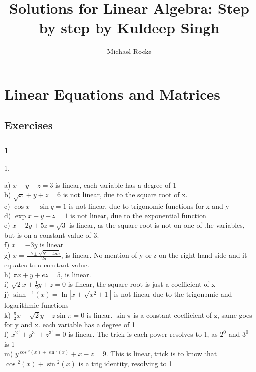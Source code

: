 \documentclass[]{report}
\title{Solutions for Linear Algebra: Step by step by Kuldeep Singh}
\author{Michael Rocke}
\begin{document}
\maketitle

\tableofcontents

\chapter{Linear Equations and Matrices}
\section {Exercises}


\subsection{1}

1.

a) $x - y -z = 3$ is linear, each variable has a degree of 1
\\
b) $\sqrt{x} + y + z = 6$ is not linear, due to the square root of x. 
\\
c) $\cos{x} + \sin{y} = 1$ is not linear, due to trigonomic functions for x and y
\\
d) $\exp{x + y + z} = 1$  is not linear, due to the exponential function
\\
e) $x - 2y + 5z = \sqrt{3}$ is linear, as the square root is not on one of the variables, but is on a constant value of 3. 
\\
f) $x = -3y$ is linear
\\
g) $x = \frac{-b \pm \sqrt{b^2 - 4ac}}{2a}$, is linear. No mention of y or z on the right hand side and it equates to a constant value.
\\
h) $\pi{}x + y + ez = 5$, is linear. 
\\
i) $\sqrt{2}x + \frac{1}{2}y + z = 0$ is linear, the square root is just a coefficient of x
\\
j) $\sinh{^{-1}}({x}) = \ln|x + \sqrt{x^2 + 1}| $ is not linear due to the trigonomic and logarithmic functions
\\
k) $\frac{\pi}{2}x - \sqrt{2}y + z\sin{\pi} = 0$ is linear. $\sin{\pi}$ is a constant coefficient of z, same goes for y and x. each variable has a degree of 1
\\
l) $x^{2^0} + y^{3^0} + z^{3^0} = 0$ is linear. The trick is each power resolves to 1, as $2^0$ and $3^0$ is 1
\\
m) $y^{\cos{^2}(x) + \sin{^2}(x)} + x - z = 9$. This is linear, trick is to know that ${\cos{^2}(x) + \sin{^2}(x)} $ is a trig identity, resolving to 1
\\
\end{document}
